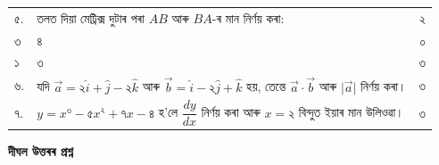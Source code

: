\documentclass[12pt,a4paper]{article} %
\begin{document}
	\noindent
	\begin{tabularx}{\textwidth}{@{}lXr@{}}
		৫. & তলত দিয়া মেট্ৰিক্স দুটাৰ পৰা $AB$ আৰু $BA$-ৰ মান নিৰ্ণয় কৰা:
		\[
		A=
		\begin{pmatrix}
			১ & ২\\
			৩ & ৪
		\end{pmatrix},
		\qquad
		B=
		\begin{pmatrix}
			২ & ০\\
			১ & ৩
		\end{pmatrix}.
		\]
		& ৩ \\
		
		৬. & যদি $\vec{a}=২\hat{i}+\hat{j}-২\hat{k}$ আৰু $\vec{b}=\hat{i}-২\hat{j}+\hat{k}$ হয়, তেন্তে $\vec{a}\cdot\vec{b}$ আৰু $\lvert\vec{a}\rvert$ নিৰ্ণয় কৰা। & ৩ \\ [4pt]
		
		৭. & $y=x^৩-৫x^২+৭x-৪$ হ'লে $\dfrac{dy}{dx}$ নিৰ্ণয় কৰা আৰু $x=২$ বিন্দুত ইয়াৰ মান উলিওৱা। & ৩
	\end{tabularx}
	
	\newpage
	\noindent
	{\large\bfseries দীঘল উত্তৰৰ প্ৰশ্ন}\\
	
\end{document}

